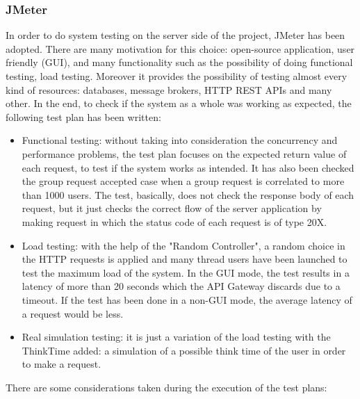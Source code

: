 \subsubsection{JMeter} 
In order to do system testing on the server side of the project, JMeter has been adopted. There are many motivation for this choice: 
open-source application, user friendly (GUI), and many functionality such as the possibility of doing functional testing, load testing. Moreover it provides the possibility of testing almost every kind of resources: databases, message brokers, HTTP REST APIs and 
many other. In the end, to check if the system as a whole was working as expected, the following test plan has been written:
\begin{itemize}
\item Functional testing: without taking into consideration the concurrency and performance problems, the test plan focuses on 
the expected return value of each request, to test if the system works as intended. It has also been checked the group 
request accepted case when a group request is correlated to more than 1000 users. The test, basically, does not check the response body of each request, but it just checks the correct flow of the server application by making request in which the status code of each request is of type 20X.
\item Load testing: with the help of the "Random Controller", a random choice in the HTTP requests is applied and many thread 
users have been launched to test the maximum load of the system. In the GUI mode, the test results in a latency of more than 
20 seconds which the API Gateway discards due to a timeout. If the test has been done in a non-GUI mode, the average latency 
of a request would be less.
\item Real simulation testing: it is just a variation of the load testing with the ThinkTime added: a simulation of a possible think time 
of the user in order to make a request.
\end{itemize}
There are some considerations taken during the execution of the test plans:
